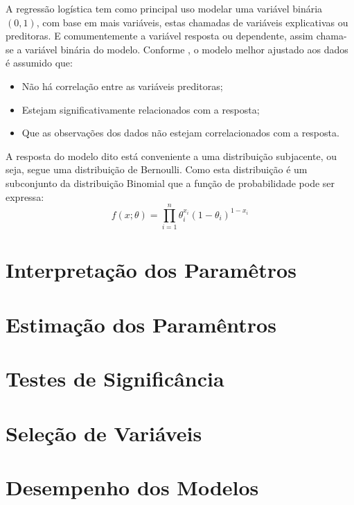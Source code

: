 \documentclass[
	12pt,				%
	openright,			%
	oneside,      %
	a4paper,			%
	english,			%
	french,				%
	spanish,			%
	brazil,				%
	]{abntex2}\usepackage[]{graphicx}\usepackage[]{xcolor}
\begin{document}
  
A regressão logística tem como principal uso modelar uma variável binária $(0,1)$,
com base em mais variáveis, estas chamadas de variáveis explicativas ou preditoras.
E comumentemente a variável resposta ou dependente, assim chama-se a variável
binária do modelo. Conforme \cite{hilbe2016practical}, o modelo melhor ajustado 
aos dados é assumido que:
\begin{itemize}
  \item Não há correlação entre as variáveis preditoras;
  \item Estejam significativamente relacionados com a resposta;
  \item Que as observações dos dados não estejam correlacionados com a resposta.
\end{itemize}
  
A resposta do modelo dito está conveniente a uma distribuição subjacente, ou seja,
segue uma distribuição de Bernoulli. Como esta distribuição é um subconjunto da distribuição 
Binomial que a função de probabilidade pode ser expressa:
\begin{equation}
  f(x;\theta) = \prod_{i = 1}^{n}\theta_{i}^{x_i}(1 - \theta_{i})^{1 - x_i}
\end{equation}





  \section{Interpretação dos Paramêtros}




  \section{Estimação dos Paramêntros}





  \section{Testes de Significância}





  \section{Seleção de Variáveis}




  \section{Desempenho dos Modelos}
\end{document}
